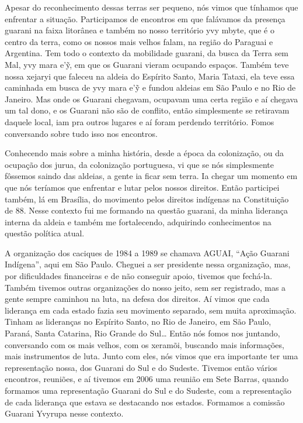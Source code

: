 Apesar do reconhecimento dessas terras ser pequeno, nós vimos que
tínhamos que enfrentar a situação. Participamos de encontros em que
falávamos da presença guarani na faixa litorânea e também no nosso
território yvy mbyte, que é o centro da terra, como os nossos mais
velhos falam, na região do Paraguai e Argentina. Tem todo o contexto da
mobilidade guarani, da busca da Terra sem Mal, yvy mara e’ỹ, em que
os Guarani vieram ocupando espaços. Também teve nossa xejaryi que
faleceu na aldeia do Espírito Santo, Maria Tataxi, ela
teve essa caminhada em busca de yvy mara e’ỹ e fundou aldeias em
São Paulo e no Rio de Janeiro. Mas onde os Guarani chegavam, ocupavam
uma certa região e aí chegava um tal dono, e os Guarani não são de
conflito, então simplesmente se retiravam daquele local, iam pra outros
lugares e aí foram perdendo território. Fomos conversando sobre tudo
isso nos encontros.

Conhecendo mais sobre a minha história, desde a época da colonização, ou
da ocupação dos jurua, da colonização portuguesa, vi que se nós
simplesmente fôssemos saindo das aldeias, a gente ia ficar sem terra.
Ia chegar um momento em que nós teríamos que enfrentar e lutar pelos
nossos direitos. Então participei também, lá em Brasília, do movimento
pelos direitos indígenas na Constituição de 88. Nesse contexto fui me
formando na questão guarani, da minha liderança interna da aldeia e
também me fortalecendo, adquirindo conhecimentos na questão política
atual.

A organização dos caciques de 1984 a 1989 se chamava AGUAI, ``Ação
Guarani Indígena'', aqui em São Paulo. Cheguei a ser presidente nessa
organização, mas, por dificuldades financeiras e de não conseguir
apoio, tivemos que fechá-la. Também tivemos outras organizações do
nosso jeito, sem ser registrado, mas a gente sempre caminhou na luta,
na defesa dos direitos. Aí vimos que cada liderança em cada estado
fazia seu movimento separado, sem muita aproximação. Tinham as
lideranças no Espírito Santo, no Rio de Janeiro, em São Paulo, Paraná,
Santa Catarina, Rio Grande do Sul\ldots{} Então nós fomos nos juntando,
conversando com os mais velhos, com os xeramõi, buscando mais
informações, mais instrumentos de luta. Junto com eles, nós vimos que
era importante ter uma representação nossa, dos Guarani do Sul e do
Sudeste. Tivemos então vários encontros, reuniões, e aí tivemos em 2006
uma reunião em Sete Barras, quando formamos uma representação Guarani
do Sul e do Sudeste, com a representação de cada liderança que estava
se destacando nos estados. Formamos a comissão Guarani Yvyrupa nesse
contexto. 

